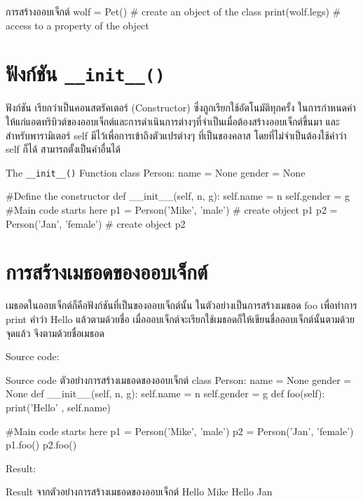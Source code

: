 \begin{codelist}{การสร้างออบเจ็กต์}{}
wolf = Pet() # create an object of the class
print(wolf.legs) # access to a property of the object
\end{codelist}


\section{ฟังก์ชัน \texttt{\_\_init\_\_()}}

ฟังก์ชัน  เรียกว่าเป็นคอนสตรัคเตอร์  (Constructor) ซึ่งถูกเรียกใช้อัตโนมัติทุกครั้ง ในการกำหนดค่าให้แก่แอตทริบิวต์ของออบเจ็กต์และการดำเนินการต่างๆที่จำเป็นเมื่อต้องสร้างออบเจ็กต์ขึ้นมา และสำหรับพารามิเตอร์ self มีไว้เพื่อการเข้าถึงตัวแปรต่างๆ ที่เป็นของคลาส โดยที่ไม่จำเป็นต้องใช้คำว่า self ก็ได้ สามารถตั้งเป็นคำอื่นได้

\begin{codelist}{The \texttt{\_\_init\_\_()} Function}{}
class Person:
    name = None
    gender = None
    
    #Define the constructor
    def __init__(self, n, g):
        self.name = n
        self.gender = g
#Main code starts here
p1 = Person('Mike', 'male') # create object p1
p2 = Person('Jan', 'female') # create object p2
\end{codelist}


\section{การสร้างเมธอดของออบเจ็กต์}

เมธอดในออบเจ็กต์ก็คือฟังก์ชันที่เป็นของออบเจ็กต์นั้น ในตัวอย่างเป็นการสร้างเมธอด foo เพื่อทำการ print คำว่า Hello แล้วตามด้วยชื่อ เมื่อออบเจ็กต์จะเรียกใช้เมธอดก็ให้เขียนชื่อออบเจ็กต์นั้นตามด้วยจุดแล้ว จึงตามด้วยชื่อเมธอด

Source code:
\begin{codelist}{Source code ตัวอย่างการสร้างเมธอดของออบเจ็กต์}{}
class Person:
    name = None
    gender = None
    def __init__(self, n, g):
        self.name = n
        self.gender = g
    def foo(self):
        print('Hello' , self.name)

#Main code starts here
p1 = Person('Mike', 'male')
p2 = Person('Jan', 'female')
p1.foo()
p2.foo()
\end{codelist}

Result:
\begin{codelist}{Result จากตัวอย่างการสร้างเมธอดของออบเจ็กต์}{}
Hello Mike
Hello Jan
\end{codelist}


